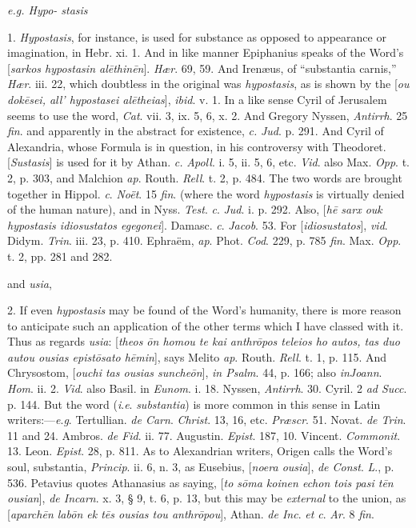 \emph{e.g. Hypo- stasis}

1. \emph{Hypostasis}, for instance, is used
for substance as opposed to appearance or imagination, in
Hebr. xi. 1. And in like manner Epiphanius speaks of the Word's
[\emph{sarkos hypostasin al\={e}thin\={e}n}]. \emph{Hær}.
69, 59. And Irenæus, of ``substantia carnis,'' \emph{Hær}.
iii. 22, which doubtless in the original was \emph{hypostasis},
as is shown by the [\emph{ou dok\={e}sei, all' hypostasei al\={e}theias}],
\emph{ibid}. v. 1. In a like sense Cyril of Jerusalem seems to
use the word, \emph{Cat}. vii. 3, ix. 5, 6, x. 2. And Gregory
Nyssen, \emph{Antirrh}. 25 \emph{fin}. and apparently in the
abstract for existence, \emph{c.} \emph{Jud}. p. 291. And
Cyril of Alexandria, whose Formula is in question, in his
controversy with Theodoret. [\emph{Sustasis}] is used for it
by Athan. \emph{c.} \emph{Apoll}. i. 5, ii. 5, 6, etc. \emph{Vid}.
also Max. \emph{Opp}. t. 2, p. 303, and Malchion \emph{ap}.
Routh. \emph{Rell}. t. 2, p. 484. The two words are brought
together in Hippol. \emph{c}. \emph{Noët}. 15 \emph{fin}.
(where the word \emph{hypostasis} is virtually denied of the
human nature), and in Nyss. \emph{Test}. \emph{c}. \emph{Jud}.
i. p. 292. Also, [\emph{h\={e} sarx ouk hypostasis
idiosustatos egegonei}]. Damasc. \emph{c}. \emph{Jacob}.
53. For [\emph{idiosustatos}], \emph{vid}. Didym. \emph{Trin}.
iii. 23, p. 410. Ephraëm, \emph{ap}. Phot. \emph{Cod}. 229,
p. 785 \emph{fin}. Max. \emph{Opp}. t. 2, pp. 281 and 282.

and \emph{usia},

2. If even \emph{hypostasis} may be found
of the Word's humanity, there is more reason to anticipate
such an application of the other terms which I have classed
with it. Thus as regards \emph{usia}: [\emph{theos \={o}n
homou te kai anthr\={o}pos teleios ho autos, tas duo autou
ousias epist\={o}sato h\={e}min}], says Melito \emph{ap}.
Routh. \emph{Rell}. t. 1, p. 115. And Chrysostom, [\emph{ouchi
tas ousias sunche\={o}n}], \emph{in Psalm}. 44, p. 166;
also \emph{in}\emph{Joann}. \emph{Hom}. ii. 2. \emph{Vid}.
also Basil. in \emph{Eunom}. i. 18. Nyssen, \emph{Antirrh}.
30. Cyril. 2 \emph{ad Succ}. p. 144. But the word (\emph{i}.\emph{e}.
\emph{substantia}) is more common in this sense in Latin
writers:—\emph{e}.\emph{g}. Tertullian. \emph{de Carn}. \emph{Christ}.
13, 16, etc. \emph{Præscr}. 51. Novat. \emph{de Trin}. 11 and
24. Ambros. \emph{de Fid}. ii. 77. Augustin. \emph{Epist}.
187, 10. Vincent. \emph{Commonit}. 13. Leon. \emph{Epist}. 28,
p. 811. As to Alexandrian writers, Origen calls the Word's
soul, substantia, \emph{Princip}. ii. 6, n. 3, as Eusebius, [\emph{noera
ousia}], \emph{de Const}. \emph{L}., p. 536. Petavius
quotes Athanasius as saying, [\emph{to s\={o}ma koinen echon
tois pasi t\={e}n ousian}], \emph{de Incarn}. x. 3, §
9, t. 6, p. 13, but this may be \emph{external} to the union,
as [\emph{aparch\={e}n lab\={o}n ek t\={e}s ousias tou
anthr\={o}pou}], Athan. \emph{de Inc}. \emph{et c}. \emph{Ar}.
8 \emph{fin}.


